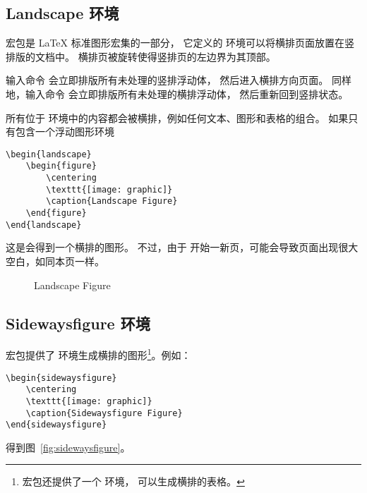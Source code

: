 \subsection{Landscape 环境}\label{ssec:landscape}

 宏包是 \LaTeX{} 标准图形宏集的一部分，
它定义的  环境可以将横排页面放置在竖排版的文档中。
横排页被旋转使得竖排页的左边界为其顶部。

输入命令  会立即排版所有未处理的竖排浮动体，
然后进入横排方向页面。
同样地，输入命令  会立即排版所有未处理的横排浮动体，
然后重新回到竖排状态。

所有位于  环境中的内容都会被横排，例如任何文本、图形和表格的组合。
如果只有包含一个浮动图形环境
\begin{lstlisting}
\begin{landscape}
	\begin{figure}
		\centering
		\texttt{[image: graphic]}
		\caption{Landscape Figure}
	\end{figure}
\end{landscape}
\end{lstlisting}
这是会得到一个横排的图形。
不过，由于  开始一新页，可能会导致页面出现很大空白，如同本页一样。

\begin{landscape} 
	\begin{figure} 
		\centering
		\resizebox{4in}{!}{\usebox{\boxgraphic}}
		\caption{Landscape Figure}\label{fig:landscape}
	\end{figure} 
\end{landscape}

\subsection{Sidewaysfigure 环境}\label{ssec:sidewaysfigure}

 宏包提供了  环境生成横排的图形\footnote{
	 宏包还提供了一个  环境，
	可以生成横排的表格。}。例如：
\begin{lstlisting}
\begin{sidewaysfigure}
	\centering
	\texttt{[image: graphic]}
	\caption{Sidewaysfigure Figure}
\end{sidewaysfigure}
\end{lstlisting}
得到图~\ref{fig:sidewaysfigure}。

\begin{sidewaysfigure}
	\centering
	\resizebox{4in}{!}{\usebox{\boxgraphic}}
	\caption{Sidewaysfigure Figure}\label{fig:sidewaysfigure}
\end{sidewaysfigure}

